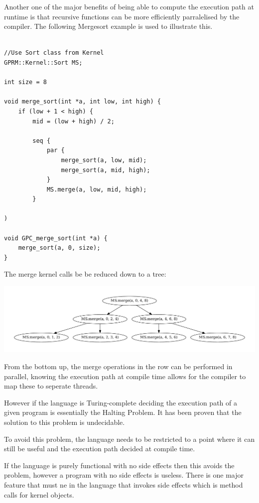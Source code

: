 Another one of the major benefits of being able to compute the execution
path at runtime is that recursive functions can be more efficiently parralelised
by the compiler. The following Mergesort example is used to illustrate this.

\begin{lstlisting}[style=myGPC]

//Use Sort class from Kernel
GPRM::Kernel::Sort MS;

int size = 8

void merge_sort(int *a, int low, int high) {
    if (low + 1 < high) {
        mid = (low + high) / 2;
   
        seq {
            par {
                merge_sort(a, low, mid);
                merge_sort(a, mid, high);
            }
            MS.merge(a, low, mid, high);            
        }
    
)

void GPC_merge_sort(int *a) {
    merge_sort(a, 0, size);
}

\end{lstlisting}

The merge kernel calls be be reduced down to a tree:

\begin{center}
\includegraphics[scale=0.5]{graphs/mergesortTree.pdf}
\end{center}


From the bottom up, the merge operations in the row can be performed in
parallel, knowing the execution path at compile time allows for the compiler
to map these to seperate threads. 


However if the language is Turing-complete deciding the execution path
of a given program is essentially the Halting Problem. It has been proven that the solution to this problem is undecidable\cite{halting}. 

To avoid this problem, the language needs to be restricted to a point where it can still be useful and the execution
path decided at compile time.

If the language is purely functional with no side effects then this avoids the problem, however a program
with no side effects is useless. There is one major feature that must ne in the language that invokes
side effects which is method calls for kernel objects. 


